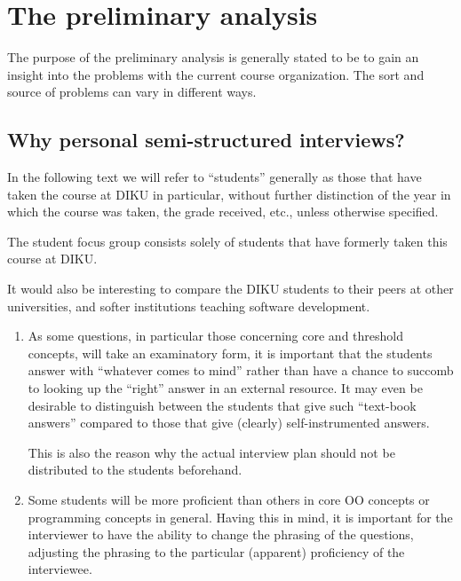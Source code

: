 \section{The preliminary analysis}

The purpose of the preliminary analysis is generally stated to be to gain an
insight into the problems with the current course organization. The sort and
source of problems can vary in different ways.

\subsection{Why personal semi-structured interviews?}

In the following text we will refer to ``students'' generally as those that
have taken the course at DIKU in particular, without further distinction of the
year in which the course was taken, the grade received, etc., unless otherwise
specified.

The student focus group consists solely of students that have formerly taken
this course at DIKU.


It would also be interesting to compare the DIKU students to their peers at
other universities, and softer institutions teaching software development.

\begin{enumerate}

\item As some questions, in particular those concerning core and threshold
concepts, will take an examinatory form, it is important that the students
answer with ``whatever comes to mind'' rather than have a chance to succomb to
looking up the ``right'' answer in an external resource. It may even be
desirable to distinguish between the students that give such ``text-book
answers'' compared to those that give (clearly) self-instrumented answers.

This is also the reason why the actual interview plan should not be distributed
to the students beforehand.

\item Some students will be more proficient than others in core OO concepts or
programming concepts in general. Having this in mind, it is important for the
interviewer to have the ability to change the phrasing of the questions,
adjusting the phrasing to the particular (apparent) proficiency of the
interviewee.

\end{enumerate}



